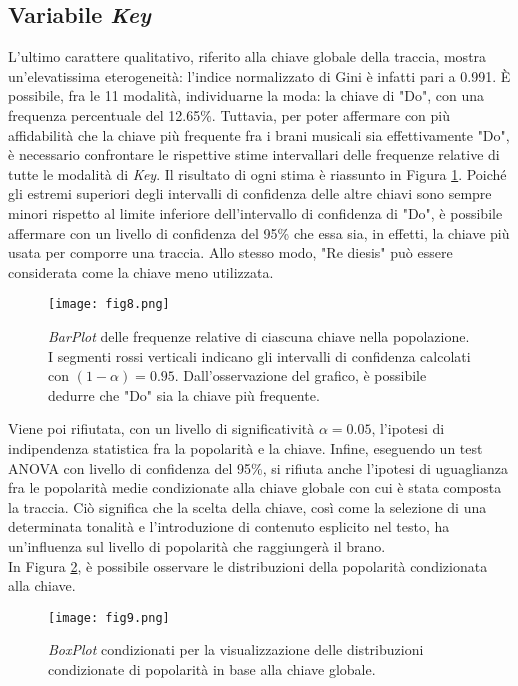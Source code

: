 \documentclass[fleqn,10pt]{SelfArx} %
\begin{document}
\subsection*{Variabile \textit{Key}}
L'ultimo carattere qualitativo, riferito alla chiave globale della traccia, mostra un'elevatissima eterogeneità: l'indice normalizzato di Gini è infatti pari a 0.991. È possibile, fra le 11 modalità, individuarne la moda: la chiave di "Do", con una frequenza percentuale del 12.65\%. Tuttavia, per poter affermare con più affidabilità che la chiave più frequente fra i brani musicali sia effettivamente "Do", è necessario confrontare le rispettive stime intervallari delle frequenze relative di tutte le modalità di \textit{Key}. Il risultato di ogni stima è riassunto in Figura \ref{fig:fig8}. Poiché gli estremi superiori degli intervalli di confidenza delle altre chiavi sono sempre minori rispetto al limite inferiore dell'intervallo di confidenza di "Do", è possibile affermare con un livello di confidenza del 95\% che essa sia, in effetti, la chiave più usata per comporre una traccia. Allo stesso modo, "Re diesis" può essere considerata come la chiave meno utilizzata.
\begin{figure}[H]
    \centering
    \texttt{[image: fig8.png]}
    \caption{\textit{BarPlot} delle frequenze relative di ciascuna chiave nella popolazione. I segmenti rossi verticali indicano gli intervalli di confidenza calcolati con $(1-\alpha)=0.95$. Dall'osservazione del grafico, è possibile dedurre che "Do" sia la chiave più frequente.}
    \label{fig:fig8}
\end{figure}
Viene poi rifiutata, con un livello di significatività $\alpha=0.05$, l'ipotesi di indipendenza statistica fra la popolarità e la chiave. Infine, eseguendo un test ANOVA con livello di confidenza del 95\%, si rifiuta anche l'ipotesi di uguaglianza fra le popolarità medie condizionate alla chiave globale con cui è stata composta la traccia. Ciò significa che la scelta della chiave, così come la selezione di una determinata tonalità e l'introduzione di contenuto esplicito nel testo, ha un'influenza sul livello di popolarità che raggiungerà il brano.\\
In Figura \ref{fig:fig9}, è possibile osservare le distribuzioni della popolarità condizionata alla chiave.
\begin{figure}[H]
    \centering
    \texttt{[image: fig9.png]}
    \caption{\textit{BoxPlot} condizionati per la visualizzazione delle distribuzioni condizionate di popolarità in base alla chiave globale.}
    \label{fig:fig9}
\end{figure}
\end{document}
